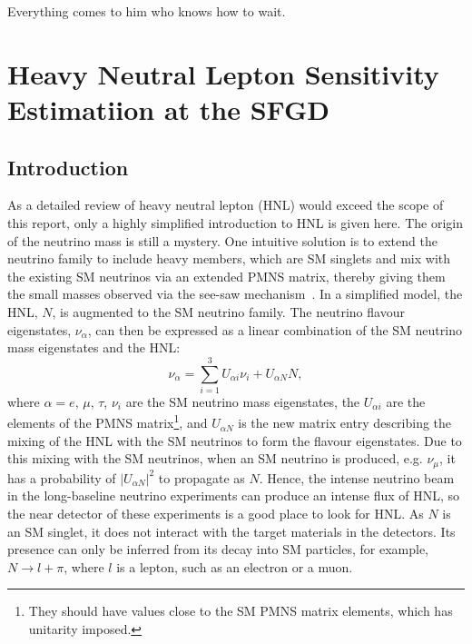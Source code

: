 \begin{savequote}[8cm]
Everything comes to him who knows how to wait.

\end{savequote}

\chapter{\label{ch:hnl}Heavy Neutral Lepton Sensitivity Estimatiion at the SFGD} 

\minitoc

    \section{Introduction}
        As a detailed review of heavy neutral lepton (HNL) would exceed the scope of this report, only a highly simplified introduction to HNL is given here. 
        The origin of the neutrino mass is still a mystery. 
        One intuitive solution is to extend the neutrino family to include heavy members, which are SM singlets and mix with the existing SM neutrinos via an extended PMNS matrix, thereby giving them the small masses observed via the see-saw mechanism~\cite{Abada:2007ux}. 
        In a simplified model, the HNL, $N$, is augmented to the SM neutrino family. 
        The neutrino flavour eigenstates, $\nu_\alpha$, can then be expressed as a linear combination of the SM neutrino mass eigenstates and the HNL:
        \begin{equation}
            \nu_\alpha = \sum_{i=1}^3 U_{\alpha i} \nu_i + U_{\alpha N} N,
        \end{equation}
        where $\alpha=e,\,\mu,\,\tau$, $\nu_i$ are the SM neutrino mass eigenstates, the $U_{\alpha i}$ are the elements of the PMNS matrix\footnote{They should have values close to the SM PMNS matrix elements, which has unitarity imposed.}, and $U_{\alpha N}$ is the new matrix entry describing the mixing of the HNL with the SM neutrinos to form the flavour eigenstates. 
        Due to this mixing with the SM neutrinos, when an SM neutrino is produced, e.g. $\nu_\mu$, it has a probability of $|U_{\alpha N}|^2$ to propagate as $N$.
        Hence, the intense neutrino beam in the long-baseline neutrino experiments can produce an intense flux of HNL, so the near detector of these experiments is a good place to look for HNL. 
        As $N$ is an SM singlet, it does not interact with the target materials in the detectors. 
        Its presence can only be inferred from its decay into SM particles, for example, $N\rightarrow l + \pi$, where $l$ is a lepton, such as an electron or a muon.
